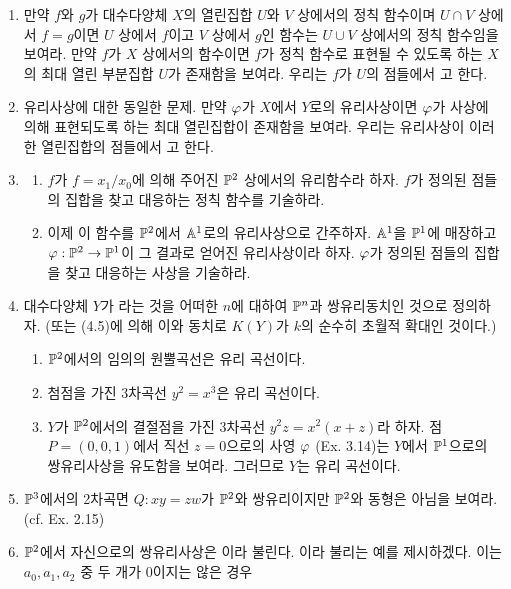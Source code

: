 	\begin{enumerate}[label=\tb{4.\arabic*.},itemindent=0mm,itemsep=2mm]
	\item 만약 $f$와 $g$가 대수다양체 $X$의 열린집합 $U$와 $V$ 상에서의 정칙 함수이며 $U\cap V$ 상에서 $f=g$이면
	$U$ 상에서 $f$이고 $V$ 상에서 $g$인 함수는 $U\cup V$ 상에서의 정칙 함수임을 보여라.
	만약 $f$가 $X$ 상에서의 함수이면 $f$가 정칙 함수로 표현될 수 있도록 하는 $X$의 최대 열린 부분집합 $U$가 존재함을 보여라.
	우리는 $f$가 $U$의 점들에서 고 한다.
	\item 유리사상에 대한 동일한 문제. 만약 $\varphi$가 $X$에서 $Y$로의 유리사상이면 $\varphi$가 사상에 의해 표현되도록 하는
	최대 열린집합이 존재함을 보여라. 우리는 유리사상이 이러한 열린집합의 점들에서 고 한다.
	\item \begin{enumerate}[label=(\alph*)]
	\item $f$가 $f=x_1/x_0$에 의해 주어진 $\mathbb{P}^2$ 상에서의 유리함수라 하자.
	$f$가 정의된 점들의 집합을 찾고 대응하는 정칙 함수를 기술하라.
	\item 이제 이 함수를 $\mathbb{P}^2$에서 $\mathbb{A}^1$로의 유리사상으로 간주하자. $\mathbb{A}^1$을 $\mathbb{P}^1$에 매장하고
	$\varphi:\mathbb{P}^2\rightarrow\mathbb{P}^1$이 그 결과로 얻어진 유리사상이라 하자. $\varphi$가 정의된 점들의 집합을 찾고 대응하는 사상을 기술하라.
	\end{enumerate}
	\item 대수다양체 $Y$가 라는 것을 어떠한 $n$에 대하여 $\mathbb{P}^n$과 쌍유리동치인 것으로 정의하자.
	(또는 (4.5)에 의해 이와 동치로 $K(Y)$가 $k$의 순수히 초월적 확대인 것이다.)
	\begin{enumerate}[label=(\alph*)]
	\item $\mathbb{P}^2$에서의 임의의 원뿔곡선은 유리 곡선이다.
	\item 첨점을 가진 3차곡선 $y^2=x^3$은 유리 곡선이다.
	\item $Y$가 $\mathbb{P}^2$에서의 결절점을 가진 3차곡선 $y^2z=x^2(x+z)$라 하자. 점 $P=(0,0,1)$에서 직선 $z=0$으로의 사영 $\varphi$%
	(Ex. 3.14)는 $Y$에서 $\mathbb{P}^1$으로의 쌍유리사상을 유도함을 보여라. 그러므로 $Y$는 유리 곡선이다.
	\end{enumerate}
	\item $\mathbb{P}^3$에서의 2차곡면 $Q:xy=zw$가 $\mathbb{P}^2$와 쌍유리이지만 $\mathbb{P}^2$와 동형은 아님을 보여라. (cf. Ex. 2.15)
	\item {} $\mathbb{P}^2$에서 자신으로의 쌍유리사상은
	이라 불린다.
	이라 불리는 예를 제시하겠다. 이는 $a_0,a_1,a_2$ 중 두 개가 0이지는 않은 경우

\end{enumerate}
